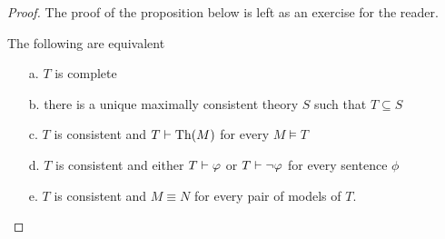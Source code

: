 \begin{proof}
The proof of the proposition below is left as an exercise for the reader.

\begin{proposition}\label{fattoconsistenzasensolato}
The following are equivalent
\begin{itemize}
\item[a.] $T$ is complete
\item[b.] there is a unique maximally consistent theory $S$ such that $T\subseteq S$
\item[c.] $T$ is consistent and $T\vdash{\rm Th}(M)$ for every $M\models T$
\item[d.] $T$ is consistent and either $T\vdash\varphi$ or $T\vdash\neg\varphi$ for every sentence $\phi$
\item[e.] $T$ is consistent and $M\equiv N$ for every pair of models of $T$.
\end{itemize}
\end{proposition}

\end{proof}
